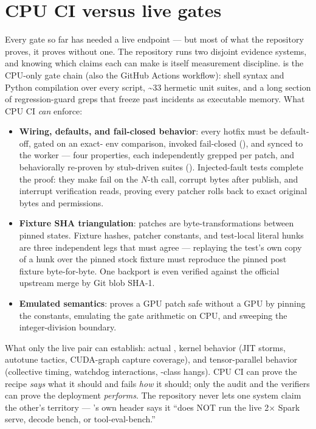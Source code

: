\section{CPU CI versus live gates}

Every gate so far has needed a live endpoint --- but most of what the repository
proves, it proves without one. The repository runs two disjoint evidence systems,
and knowing which claims each
can make is itself measurement discipline. 
is the CPU-only gate chain (also the GitHub Actions workflow): shell syntax
and Python compilation over every script, \textasciitilde{}33 hermetic unit
suites, and a long section of regression-guard greps that freeze past
incidents as executable memory. What CPU CI \emph{can} enforce:

\begin{itemize}
\item \textbf{Wiring, defaults, and fail-closed behavior}: every hotfix
  must be default-off, gated on an exact- env comparison, invoked
  fail-closed (), and synced to the worker --- four
  properties, each independently grepped per patch, and behaviorally
  re-proven by stub-driven suites (). Injected-fault
  tests complete the proof: they make  fail on the
  $N$-th call, corrupt bytes after publish, and interrupt verification
  reads, proving every patcher rolls back to exact original bytes and
  permissions.
\item \textbf{Fixture SHA triangulation}: patches are byte-transformations
  between pinned states. Fixture hashes, patcher constants, and
  test-local literal hunks are three independent legs that must agree ---
  replaying the test's own copy of a hunk over the pinned stock fixture
  must reproduce the pinned post fixture byte-for-byte. One backport is
  even verified against the official upstream merge by Git blob SHA-1.
\item \textbf{Emulated semantics}: 
  proves a GPU patch safe without a GPU by pinning the constants, emulating
  the gate arithmetic on CPU, and sweeping the integer-division boundary.
\end{itemize}

What only the live pair can establish: actual \tokspersec{}, kernel behavior
(JIT storms, autotune tactics, CUDA-graph capture coverage), and
tensor-parallel behavior (collective timing, watchdog interactions,
-class hangs). CPU CI can prove the recipe \emph{says} what it
should and fails \emph{how} it should; only the audit and the verifiers can
prove the deployment \emph{performs}. The repository never lets one system claim
the other's territory --- 's own header says it
``does NOT run the live 2$\times$ Spark serve, decode bench, or
tool-eval-bench.''

